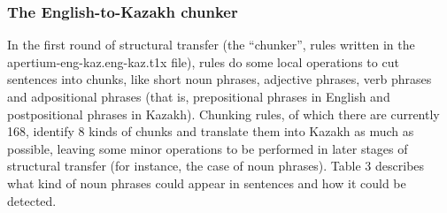 \documentclass[11pt]{article}
\begin{document}
\begin{itemize}
\subsubsection{The English-to-Kazakh chunker}

In the first round of structural transfer (the “chunker”, rules written in the apertium-eng-kaz.eng-kaz.t1x file), rules do some local operations to cut sentences into chunks, like short noun phrases, adjective phrases, verb phrases and adpositional phrases (that is, prepositional phrases in English and postpositional phrases in Kazakh).
Chunking rules, of which there are currently 168, identify 8 kinds of chunks and translate them into Kazakh as much as possible, leaving some minor operations to be performed in later stages of structural transfer (for instance, the case of noun phrases). Table 3 describes what kind of noun phrases could appear in sentences and how it could be detected.



\end{itemize}
\end{document}
